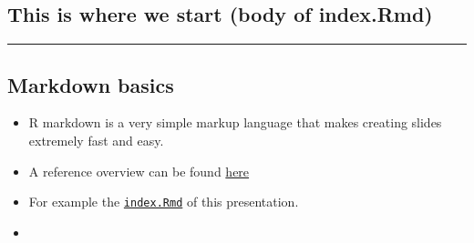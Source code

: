 \subsection{This is where we start (body of
index.Rmd)}\label{this-is-where-we-start-body-of-index.rmd}

\begin{Shaded}
\begin{Highlighting}[]
\StringTok{ }
\StringTok{ }
\StringTok{ }
\StringTok{ }\NormalTok{[]}
\NormalTok{---}


\NormalTok{---}\StringTok{ }

\end{Highlighting}
\end{Shaded}

\begin{center}\rule{0.5\linewidth}{\linethickness}\end{center}

\subsection{Markdown basics}\label{markdown-basics}

\begin{itemize}
\item
  R markdown is a very simple markup language that makes creating slides
  extremely fast and easy.
\item
  A reference overview can be found
  \href{http://rmarkdown.rstudio.com/authoring_basics.html}{here}
\item
  For example the
  \href{https://github.com/fischuu/fischuu.github.io/raw/master/presentations/SlidifyYourPresentations/index.Rmd}{\texttt{index.Rmd}}
  of this presentation.
\item
\end{itemize}
